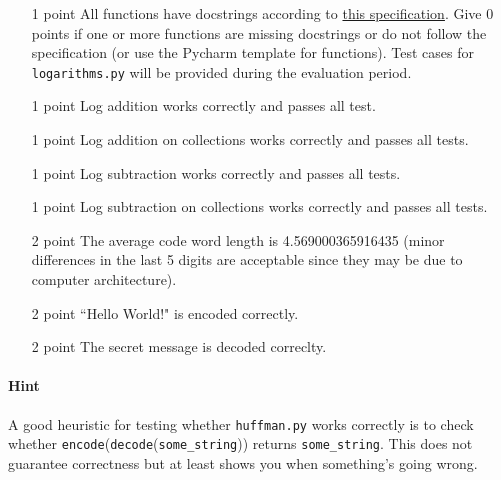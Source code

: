 \documentclass[11pt, leqno, a4paper]{article}
\begin{document}
\begin{itemize}
\item[1 point] All functions have docstrings according to \href{https://www.python.org/dev/peps/pep-0257/}{this specification}. Give 0 points if one or more
functions are missing docstrings or do not follow the specification (or use the Pycharm template for functions). Test cases for \texttt{logarithms.py} will
be provided during the evaluation period.
\item[1 point] Log addition works correctly and passes all test.
\item[1 point] Log addition on collections works correctly and passes all tests.
\item[1 point] Log subtraction works correctly and passes all tests.
\item[1 point] Log subtraction on collections works correctly and passes all tests.
\item[2 point] The average code word length is 4.569000365916435 (minor differences in the last 5 digits are acceptable since they may be due to computer
architecture).
\item[2 point] ``Hello World!" is encoded correctly.
\item[2 point] The secret message is decoded correclty.
\end{itemize}
\paragraph{Hint} A good heuristic for testing whether \texttt{huffman.py} works correctly is to check whether \texttt{encode}(\texttt{decode}(\texttt{some\_string}))
returns \texttt{some\_string}. This does not guarantee correctness but at least shows you when something's going wrong.
\end{document}
